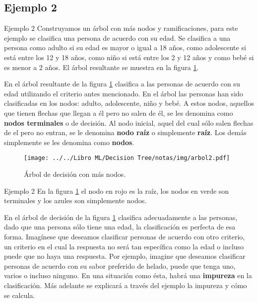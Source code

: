 \documentclass[11pt,aspectratio=169]{beamer}
\begin{document}
\subsection{Ejemplo 2}
\begin{frame}{Ejemplo 2}
	Construyamos un árbol con más nodos y ramificaciones, para este ejemplo se clasifica una persona de acuerdo con su edad. Se clasifica a una persona como adulto si su 
edad es mayor o igual a 18 años, como adolescente si está entre los 12 y 18 años, como niño si está entre los 2 y 12 años y como bebé si es menor a 2 años. El árbol 
resultante se muestra en la figura \ref{fig:arbol2}.

En el árbol resultante de la figura \ref{fig:arbol2} clasifica a las personas de acuerdo con su edad utilizando el criterio antes mencionado. En el árbol las personas 
han sido clasificadas en los nodos: adulto, adolescente, niño y bebé. A estos nodos, aquellos que tienen flechas que llegan a él pero no salen de él, se les denomina 
como \textbf{nodos terminales} o de decisión. Al nodo inicial, aquel del cual sólo salen flechas de el pero no entran, se le denomina \textbf{nodo raíz} o simplemente
\textbf{raíz}. Los demás simplemente se les denomina como \textbf{nodos}. 

\begin{figure}[H]
	\centering
	\texttt{[image: ../../Libro ML/Decision Tree/notas/img/arbol2.pdf]}
	\caption{Árbol de decisión con más nodos.}
	\label{fig:arbol2}
\end{figure}
\end{frame}

\begin{frame}{Ejemplo 2}
	En la figura \ref{fig:arbol2} el nodo en rojo es la raíz, los nodos en verde son terminales y los azules son simplemente nodos.

En el árbol de decisión de la figura \ref{fig:arbol2} clasifica adecuadamente a las personas, dado que una persona sólo tiene una edad, la clasificación es 
perfecta de esa forma. Imagínese que deseamos clasificar personas de acuerdo con otro criterio, un criterio en el cual la respuesta no será tan específica como la 
edad o incluso puede que no haya una respuesta. Por ejemplo, imagine que deseamos clasificar personas de acuerdo con su sabor preferido de helado, puede que tenga 
uno, varios o incluso ninguno.
En una situación como ésta, habrá una \textbf{impureza} en la clasificación. Más adelante se explicará a través del ejemplo la impureza y cómo se calcula.
\end{frame}
\end{document}
